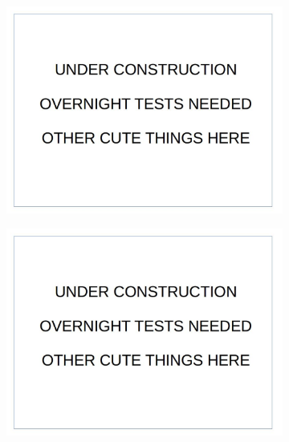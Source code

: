 \documentclass[12pt]{report}
\begin{document}
\begin{figure}
  \begin{subfigure}{.49\linewidth}
  \includegraphics[width=1\linewidth]{figures/placeholder.jpg}
  \caption{}
\end{subfigure}
\hfill
\begin{subfigure}{.49\linewidth}
  \includegraphics[width=1\linewidth]{figures/placeholder.jpg}
  \caption{}
\end{subfigure}
\hfill
\begin{subfigure}{.49\linewidth}

\end{subfigure}
\end{figure}
\end{document}

